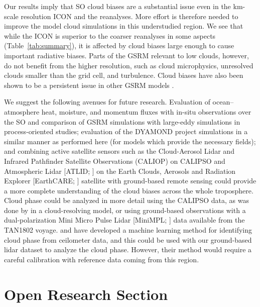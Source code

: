 \documentclass[draft]{agujournal2019}
\begin{document}
Our results imply that SO cloud biases are a substantial issue even in the km-scale resolution ICON and the reanalyses. More effort is therefore needed to improve the model cloud simulations in this understudied region. We see that while the ICON is superior to the coarser reanalyses in some aspects (Table~\ref{tab:summary}), it is affected by cloud biases large enough to cause important radiative biases. Parts of the GSRM relevant to low clouds, however, do not benefit from the higher resolution, such as cloud microphysics, unresolved clouds smaller than the grid cell, and turbulence. Cloud biases have also been shown to be a persistent issue in other GSRM models \cite{seiki2022}.

We suggest the following avenues for future research. Evaluation of ocean--atmosphere heat, moisture, and momentum fluxes with in-situ observations over the SO and comparison of GSRM simulations with large-eddy simulations in process-oriented studies; evaluation of the DYAMOND project simulations in a similar manner as performed here (for models which provide the necessary fields); and combining active satellite sensors such as the Cloud-Aerosol Lidar and Infrared Pathfinder Satellite Observations (CALIOP) on CALIPSO and Atmospheric Lidar [ATLID; ] on the Earth Clouds, Aerosols and Radiation Explorer [EarthCARE; ] satellite with ground-based remote sensing could provide a more complete understanding of the cloud biases across the whole troposphere. Cloud phase could be analyzed in more detail using the CALIPSO data, as was done by  in a cloud-resolving model, or using ground-based observations with a dual-polarization Mini Micro Pulse Lidar [MiniMPL; ] data available from the TAN1802 voyage.  and  have developed a machine learning method for identifying cloud phase from ceilometer data, and this could be used with our ground-based lidar dataset to analyze the cloud phase. However, their method would require a careful calibration with reference data coming from this region.

\section*{Open Research Section}
\end{document}
